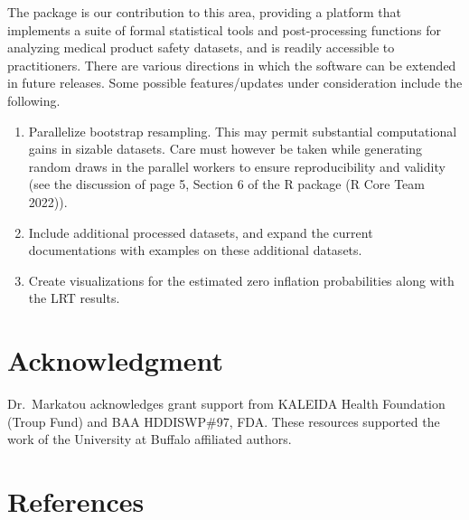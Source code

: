 The package  is our contribution to this area, providing a platform that implements a suite of formal statistical tools and post-processing functions for analyzing medical product safety datasets, and is readily accessible to practitioners. There are various directions in which the software can be extended in future releases. Some possible features/updates under consideration include the following.

\begin{enumerate}
\def\labelenumi{\arabic{enumi}.}
\item
  Parallelize bootstrap resampling. This may permit substantial computational gains in sizable datasets. Care must however be taken while generating random draws in the parallel workers to ensure reproducibility and validity (see the discussion of page 5, Section 6 of the R package  (R Core Team 2022)).
\item
  Include additional processed datasets, and expand the current documentations with examples on these additional datasets.
\item
  Create visualizations for the estimated zero inflation probabilities along with the LRT results.
\end{enumerate}

\hypertarget{acknowledgment}{%
\section{Acknowledgment}\label{acknowledgment}}

Dr.~Markatou acknowledges grant support from KALEIDA Health Foundation (Troup Fund) and BAA HDDISWP\#97, FDA. These resources supported the work of the University at Buffalo affiliated authors.

\hypertarget{references}{%
\section*{References}\label{references}}

